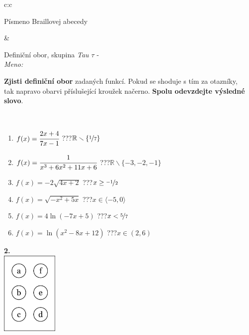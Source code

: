 \documentclass[10pt]{report}
\begin{document}
\begin{tabular}{c:c}
\begin{minipage}[c][104.5mm][t]{0.5\linewidth}
\begin{center}
\begin{minipage}{0.20\linewidth}
\begin{center}
{\small Písmeno Braillovej abecedy}
\end{center}
\end{minipage}
\end{center}
\end{minipage}
&
\begin{minipage}[c][104.5mm][t]{0.5\linewidth}
\begin{center}
\vspace{7mm}
{\huge Definiční obor, skupina \textit{Tau $\tau$} -}\\[5mm]
\textit{Meno:}\phantom{xxxxxxxxxxxxxxxxxxxxxxxxxxxxxxxxxxxxxxxxxxxxxxxxxxxxxxxxxxxxxxxxx}\\[5mm]
\begin{minipage}{0.95\linewidth}
\textbf{Zjisti definiční obor} zadaných funkcí. Pokud se shoduje s tím za otazníky,\\tak napravo obarvi příslušející kroužek načerno. \textbf{Spolu odevzdejte výsledné slovo}.
\end{minipage}
\\[1mm]
\begin{minipage}{0.79\linewidth}
\begin{center}
\begin{varwidth}{\linewidth}
\begin{enumerate}
\normalsizerrr
\item $f(x)=\cfrac{2x+4}{7x-1}$\quad \dotfill\; ???\;\dotfill \quad $\mathbb{R}\smallsetminus\{\nicefrac{1}{7}\}$
\item $f(x)=\cfrac{1}{x^3+6x^2+11x+6}$\quad \dotfill\; ???\;\dotfill \quad $\mathbb{R}\smallsetminus\{-3,-2,-1\}$
\item $f(x)=-2\sqrt{4x+2}$\quad \dotfill\; ???\;\dotfill \quad $x\geq\nicefrac{-1}{2}$
\item $f(x)=\sqrt{-x^2+5x}$\quad \dotfill\; ???\;\dotfill \quad $x\in\langle-5 , 0\rangle$
\item $f(x)=4\ln{(-7x+5)}$\quad \dotfill\; ???\;\dotfill \quad $x<\nicefrac{5}{7}$
\item $f(x)=\ln{(x^2-8x+12)}$\quad \dotfill\; ???\;\dotfill \quad $x\in(2 , 6)$
\end{enumerate}
\end{varwidth}
\end{center}
\end{minipage}
\begin{minipage}{0.20\linewidth}
\begin{center}
{\Huge\bfseries 2.} \\[2mm]
\includegraphics[height=40mm]{../images/braille.png}

\end{center}
\end{minipage}
\end{center}
\end{minipage}
\end{tabular}
\end{document}
